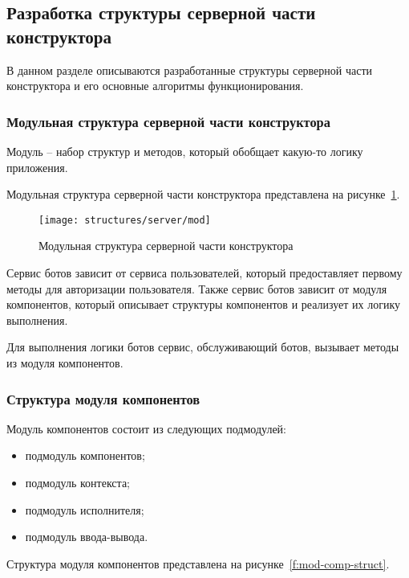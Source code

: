 
\subsection{Разработка структуры серверной части конструктора}


В данном разделе описываются разработанные структуры серверной части
конструктора и его основные алгоритмы функционирования.

\subsubsection{Модульная структура серверной части конструктора}

Модуль – набор структур и методов, который обобщает какую-то логику
приложения.

Модульная структура серверной части конструктора представлена на
рисунке~\ref{f:mod-server-struct}.

\begin{figure}[ht]
	\centering
	\vspace{\toppaddingoffigure}
	\texttt{[image: structures/server/mod]}
	\caption{Модульная структура серверной части конструктора}
	\label{f:mod-server-struct}
\end{figure}

Сервис ботов зависит от сервиса пользователей, который предоставляет
первому методы для авторизации пользователя. Также сервис ботов зависит
от модуля компонентов, который описывает структуры компонентов и
реализует их логику выполнения.

Для выполнения логики ботов сервис, обслуживающий ботов, вызывает
методы из модуля компонентов.

\subsubsection{Структура модуля компонентов}

Модуль компонентов состоит из следующих подмодулей:
\begin{itemize}
	\item подмодуль компонентов;
	\item подмодуль контекста;
	\item подмодуль исполнителя;
	\item подмодуль ввода-вывода.
\end{itemize}

Структура модуля компонентов представлена на рисунке~\ref{f:mod-comp-struct}.

